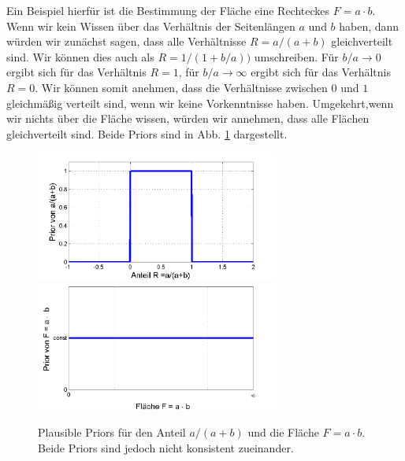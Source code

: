 Ein Beispiel hierfür ist die Bestimmung der Fläche eine Rechteckes $F=a \cdot b$.
Wenn wir kein Wissen über das Verhältnis der Seitenlängen $a$ und $b$ 
haben, dann würden wir zunächst sagen, dass alle Verhältnisse $R = a/(a+b)$ gleichverteilt sind. Wir können dies auch als $R=1/(1+b/a))$
umschreiben. Für $b/a \rightarrow 0$ ergibt sich für das Verhältnis 
$R=1$, für $b/a \rightarrow \infty$ ergibt sich für das Verhältnis
$R=0$. Wir können somit anehmen, dass die Verhältnisse zwischen 
$0$ und $1$ gleichmäßig verteilt sind, wenn wir keine Vorkenntnisse 
haben. 
Umgekehrt,wenn wir nichts über die Fläche wissen, würden wir annehmen, dass alle Flächen gleichverteilt sind. Beide Priors sind in Abb. \ref{fig:Beispiel_Flaechenbestimmung_Verteilungen01} dargestellt.

\begin{figure}[!h]
 	\begin{center}
		\includegraphics[width=80mm]{08_vorlesung/media/prior_des_Anteils_1.png}
		\includegraphics[width=80mm]{08_vorlesung/media/prior_der_Flaeche_1.png}
		\caption{Plausible Priors für den Anteil $a/(a+b)$ und die Fläche $F = a\cdot b.$ Beide Priors sind jedoch nicht konsistent zueinander.} 
		\label{fig:Beispiel_Flaechenbestimmung_Verteilungen01} 
	\end{center}
\end{figure}
